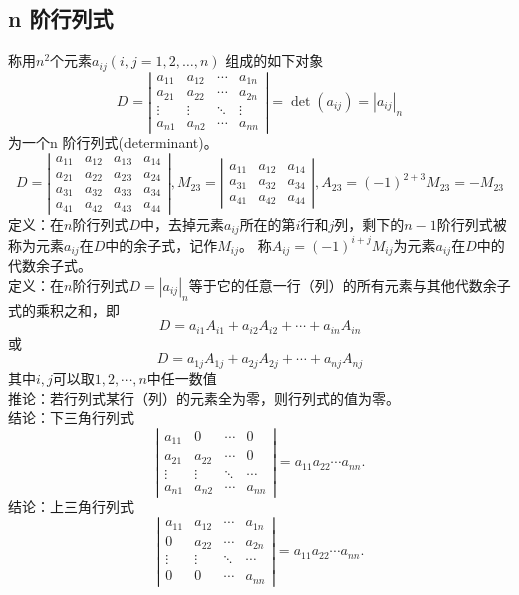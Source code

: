 \subsection{n 阶行列式}
称用$n^2$个元素$a_{ij}  (i,j =1,2,…,n)$ 组成的如下对象
$$
D=\left|
\begin{array}{cccc} 
a_{11} & a_{12} & \cdots & a_{1n} \\ 
a_{21} & a_{22} & \cdots & a_{2n} \\ 
\vdots & \vdots & \ddots & \vdots \\
a_{n1} & a_{n2} & \cdots & a_{nn} 
\end{array}
\right|=\det(a_{ij})=|a_{ij}|_{n}
$$
为一个n 阶行列式(determinant)。
$$
D=\left|
\begin{array}{cccc} 
a_{11} & a_{12} & a_{13} & a_{14} \\
a_{21} & a_{22} & a_{23} & a_{24} \\
a_{31} & a_{32} & a_{33} & a_{34} \\
a_{41} & a_{42} & a_{43} & a_{44} 
\end{array}\right|,
M_{23}=\left|
\begin{array}{ccc} 
a_{11} & a_{12} & a_{14} \\
a_{31} & a_{32} & a_{34} \\
a_{41} & a_{42} & a_{44} 
\end{array}\right|,A_{23}=(-1)^{2+3}M_{23}=-M_{23}
$$
{\color{red}定义：}在$n$阶行列式$D$中，去掉元素$a_{ij}$所在的第$i$行和$j$列，剩下的$n-1$阶行列式被称为元素$a_{ij}$在$D$中的余子式，记作$M_{ij}$。
称$A_{ij}=(-1)^{i+j}M_{ij}$为元素$a_{ij}$在$D$中的代数余子式。\\
{\color{red}定义：}在$n$阶行列式$D=|a_{ij}|_{n}$等于它的任意一行（列）的所有元素与其他代数余子式的乘积之和，即
$$
D=a_{i1}A_{i1}+a_{i2}A_{i2}+\cdots+a_{in}A_{in}
$$
或
$$
D=a_{1j}A_{1j}+a_{2j}A_{2j}+\cdots+a_{nj}A_{nj}
$$
其中$i,j$可以取$1,2,\cdots,n$中任一数值\\
{\color{blue}推论：}若行列式某行（列）的元素全为零，则行列式的值为零。\\
{\color{green}结论：下三角行列式}
$$
\left|\begin{array}{cccc} 
a_{11} & 0 & \cdots & 0 \\
a_{21} & a_{22} & \cdots & 0 \\
\vdots & \vdots & \ddots & \cdots \\
a_{n1} & a_{n2} & \cdots & a_{nn} 
\end{array}\right|=a_{11}a_{22}\cdots a_{nn}.
$$
{\color{green}结论：上三角行列式}
$$
\left|\begin{array}{cccc} 
a_{11} & a_{12} & \cdots & a_{1n} \\
0 & a_{22} & \cdots & a_{2n} \\
\vdots & \vdots & \ddots & \cdots \\
0 & 0 & \cdots & a_{nn} 
\end{array}\right|=a_{11}a_{22}\cdots a_{nn}.
$$
